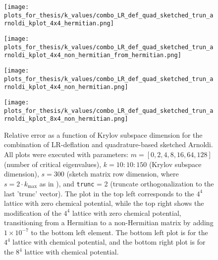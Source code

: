 \begin{figure}[H]
    \centering
    \begin{minipage}{0.45\textwidth}
        \centering
        \texttt{[image: plots\_for\_thesis/k\_values/combo\_LR\_def\_quad\_sketched\_trun\_arnoldi\_kplot\_4x4\_hermitian.png]} %
    \end{minipage}%
    \hspace{0.02\textwidth} %
    \begin{minipage}{0.45\textwidth}
        \centering
        \texttt{[image: plots\_for\_thesis/k\_values/combo\_LR\_def\_quad\_sketched\_trun\_arnoldi\_kplot\_4x4\_non\_hermitian\_from\_hermitian.png]} %
    \end{minipage}
    
    \vspace{0.02\textwidth} %
    
    \begin{minipage}{0.45\textwidth}
        \centering
        \texttt{[image: plots\_for\_thesis/k\_values/combo\_LR\_def\_quad\_sketched\_trun\_arnoldi\_kplot\_4x4\_non\_hermitian.png]} %
    \end{minipage}%
    \hspace{0.02\textwidth} %
    \begin{minipage}{0.45\textwidth}
        \centering
        \texttt{[image: plots\_for\_thesis/k\_values/combo\_LR\_def\_quad\_sketched\_trun\_arnoldi\_kplot\_8x4\_non\_hermitian.png]} %
    \end{minipage}
    
    \caption{\small Relative error as a function of Krylov subspace dimension for the combination of LR-deflation and quadrature-based sketched Arnoldi. All plots were executed with parameters: $m = [0, 2, 4, 8, 16, 64, 128]$ (number of critical eigenvalues), $k = 10:10:150$ (Krylov subspace dimension), $s = 300$ (sketch matrix row dimension, where $s = 2 \cdot k_{\text{max}}$ as in \cite{41}), and \texttt{trunc} = 2 (truncate orthogonalization to the last 'trunc' vector). The plot in the top left corresponds to the $4^4$ lattice with zero chemical potential, while the top right shows the modification of the $4^4$ lattice with zero chemical potential, transitioning from a Hermitian to a non-Hermitian matrix by adding $1 \times 10^{-7}$ to the bottom left element. The bottom left plot is for the $4^4$ lattice with chemical potential, and the bottom right plot is for the $8^4$ lattice with chemical potential.}
    \label{fig:combo_LR+skectched_arnoldi_k_plot}
\end{figure}

